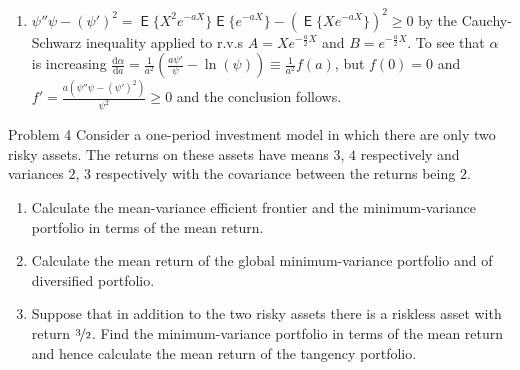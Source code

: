 \documentclass[10pt]{beamer}
\newcommand{\ds}{\displaystyle}
\DeclareMathOperator\expc{\mathsf{E}}
\theoremstyle{definition}
\begin{document}
\begin{frame}[allowframebreaks]
\begin{enumerate}
    \item $\ds\psi''\psi - (\psi')^2 = \expc\big\{X^2e^{-aX}\big\}\expc\big\{e^{-aX}\big\} - (\expc\big\{Xe^{-aX}\big\})^2 \geqslant 0$
      by the Cauchy-Schwarz inequality applied to r.v.s $\ds A = Xe^{-\frac{a}{2}X}$ and $\ds B = e^{-\frac{a}{2}X}$. To see that $\alpha$ is increasing $\ds\frac{\text{d}\alpha}{\text{d}a} = \frac{1}{a^2}\left(\frac{a\psi'}{\psi} - \ln (\psi)\right)\equiv\frac{1}{a^2}f(a)$, but $f(0) = 0$ and $\ds f' = \frac{a(\psi''\psi - (\psi')^2)}{\psi^2}\geqslant 0$ and the conclusion follows.
  \end{enumerate}
\end{frame}

\begin{frame}{Problem 4}
  Consider a one-period investment model in which there are only two risky assets. The returns on these assets have means $3$, $4$ respectively and variances $2$, $3$ respectively with the covariance between the returns being $2$.
  \begin{enumerate}
    \item Calculate the mean-variance efficient frontier and the minimum-variance portfolio in terms of the mean return.
    \item Calculate the mean return of the global minimum-variance portfolio and of diversified portfolio.
    \item Suppose that in addition to the two risky assets there is a riskless asset with return $\nicefrac{3}{2}$. Find the minimum-variance portfolio in terms of the mean return and hence calculate the mean return of the tangency portfolio.
  \end{enumerate}
\end{frame}
\end{document}
